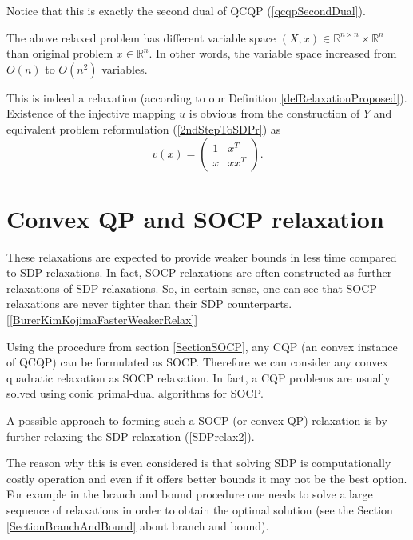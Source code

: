 \documentclass[12pt]{book}
\theoremstyle{definition}
\begin{document}
\rem Notice that this is exactly the second dual of QCQP (\ref{qcqpSecondDual}).




The above relaxed problem has different variable space $(X,x)\in \mathbb{R}^{n\times n}\times \mathbb{R}^n$ than original problem $x\in \mathbb{R}^n$. 
In other words, the variable space increased from $O(n)$ to $O(n^2)$ variables.

\rem This is indeed a relaxation (according to our Definition \ref{defRelaxationProposed}). Existence of the injective mapping $u$ is obvious from the construction of $Y$ and equivalent problem reformulation (\ref{2ndStepToSDPr}) as 
$$v(x)=\left(
\begin{array}{cc}
1 & x^T\\
x & xx^T
\end{array}\right).
$$

\section{Convex QP and SOCP relaxation}
\label{SectionSOCPrelaxation}

These relaxations are expected to provide weaker bounds in less time compared to SDP relaxations. In fact, SOCP relaxations are often constructed as further relaxations of SDP relaxations. So, in certain sense, one can see that SOCP relaxations are never tighter than their SDP counterparts. [\ref{BurerKimKojimaFasterWeakerRelax}]

Using the procedure from section \ref{SectionSOCP}, any CQP (an convex instance of QCQP) can be formulated as SOCP. Therefore we can consider any convex quadratic relaxation as SOCP relaxation. In fact, a CQP problems are usually solved using conic primal-dual algorithms for SOCP.


A possible approach to forming such a SOCP (or convex QP) relaxation is by further relaxing the SDP relaxation (\ref{SDPrelax2}).

The reason why this is even considered is that solving SDP is computationally costly operation and even if it offers better bounds it may not be the best option. For example in the branch and bound procedure one needs to solve a large sequence of relaxations in order to obtain the optimal solution (see the Section \ref{SectionBranchAndBound} about branch and bound).
\end{document}
